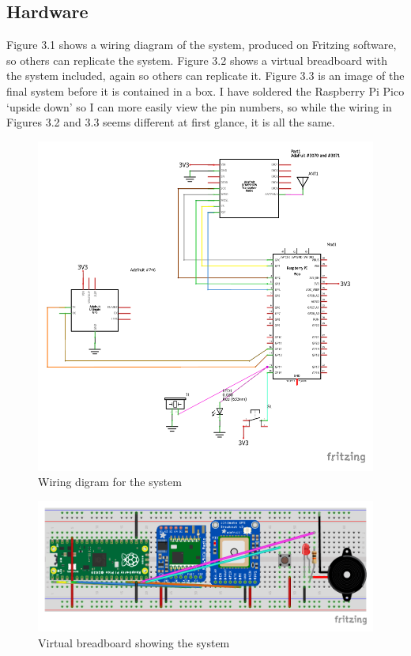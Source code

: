 \documentclass[12pt,a4paper]{report}
\begin{document}
\subsection{Hardware}
Figure 3.1 shows a wiring diagram of the system, produced on Fritzing software, so others can replicate the system. Figure 3.2 shows a virtual breadboard with the system included, again so others can replicate it. Figure 3.3 is an image of the final system before it is contained in a box. I have soldered the Raspberry Pi Pico `upside down' so I can more easily view the pin numbers, so while the wiring in Figures 3.2 and 3.3 seems different at first glance, it is all the same. 
\begin{figure}[h]
\begin{center}
\includegraphics[scale=0.8]{wiring.pdf}
\end{center}
\caption{Wiring digram for the system}
\end{figure}

\begin{figure}[h]
\begin{center}
\includegraphics{breadboard.pdf}
\end{center}
\caption{Virtual breadboard showing the system}
\end{figure}
\end{document}
